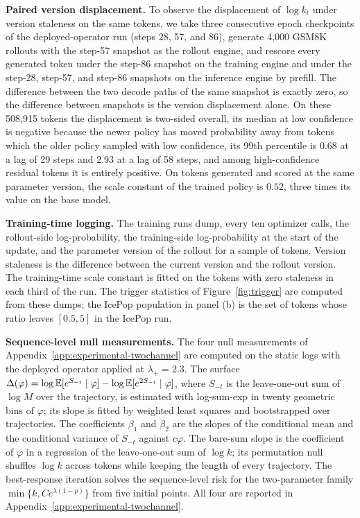 \noindent\textbf{Paired version displacement.}
To observe the displacement of $\log k_t$ under version staleness on the same tokens, we take three consecutive epoch checkpoints of the deployed-operator run (steps 28, 57, and 86), generate 4{,}000 GSM8K rollouts with the step-57 snapshot as the rollout engine, and rescore every generated token under the step-86 snapshot on the training engine and under the step-28, step-57, and step-86 snapshots on the inference engine by prefill. The difference between the two decode paths of the same snapshot is exactly zero, so the difference between snapshots is the version displacement alone. On these 508{,}915 tokens the displacement is two-sided overall, its median at low confidence is negative because the newer policy has moved probability away from tokens which the older policy sampled with low confidence, its 99th percentile is $0.68$ at a lag of 29 steps and $2.93$ at a lag of 58 steps, and among high-confidence residual tokens it is entirely positive. On tokens generated and scored at the same parameter version, the scale constant of the trained policy is $0.52$, three times its value on the base model.

\noindent\textbf{Training-time logging.}
The training runs dump, every ten optimizer calls, the rollout-side log-probability, the training-side log-probability at the start of the update, and the parameter version of the rollout for a sample of tokens. Version staleness is the difference between the current version and the rollout version. The training-time scale constant is fitted on the tokens with zero staleness in each third of the run. The trigger statistics of Figure~\ref{fig:trigger} are computed from these dumps; the IcePop population in panel (b) is the set of tokens whose ratio leaves $[0.5,5]$ in the IcePop run.

\noindent\textbf{Sequence-level null measurements.}
The four null measurements of Appendix~\ref{app:experimental-twochannel} are computed on the static logs with the deployed operator applied at $\lambda_+=2.3$. The surface $\Delta(\varphi)=\log\mathbb{E}[e^{S_{-t}}\mid\varphi]-\log\mathbb{E}[e^{2S_{-t}}\mid\varphi]$, where $S_{-t}$ is the leave-one-out sum of $\log M$ over the trajectory, is estimated with log-sum-exp in twenty geometric bins of $\varphi$; its slope is fitted by weighted least squares and bootstrapped over trajectories. The coefficients $\beta_1$ and $\beta_2$ are the slopes of the conditional mean and the conditional variance of $S_{-t}$ against $c\varphi$. The bare-sum slope is the coefficient of $\varphi$ in a regression of the leave-one-out sum of $\log k$; its permutation null shuffles $\log k$ across tokens while keeping the length of every trajectory. The best-response iteration solves the sequence-level risk for the two-parameter family $\min\{k,Ce^{\lambda(1-p)}\}$ from five initial points. All four are reported in Appendix~\ref{app:experimental-twochannel}.

